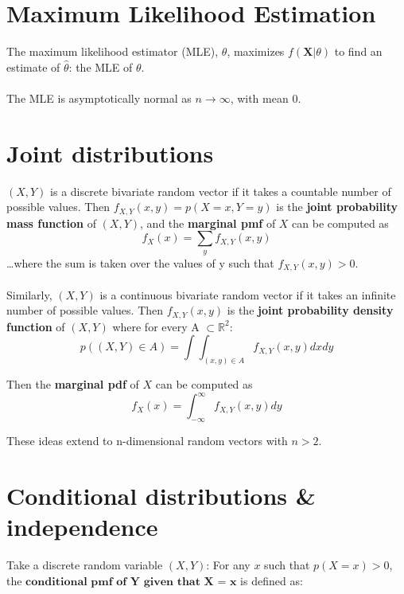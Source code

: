 \documentclass[12pt]{book}
\begin{document}
\section{Maximum Likelihood Estimation}
The maximum likelihood estimator (MLE), $\theta$, maximizes $f(\textbf{X}|\theta)$ to find an estimate of $\hat \theta$: the MLE of $\theta$. 
\\\\
The MLE is asymptotically normal as $n \rightarrow \infty$, with mean 0.
\\


\section{Joint distributions}
$(X,Y)$ is a discrete bivariate random vector if it takes a
countable number of possible values. Then $f_{X,Y}(x,y) = p(X = x, Y = y)$ is the \textbf{joint probability mass
function} of $(X,Y)$, and the \textbf{marginal pmf} of $X$ can be computed as
\begin{equation}
f_X(x) = \sum_{y}f_{X,Y}(x,y)
\end{equation}
\dots where the sum is taken over the values of y such that
$f_{X,Y}(x,y) > 0$.
\\\\
Similarly, $(X,Y)$ is a continuous bivariate random vector if it takes an
infinite number of possible values. Then $f_{X,Y}(x,y)$ is the \textbf{joint probability density
function} of $(X,Y)$ where for every A $\subset \mathbb{R}^2$:
\begin{equation}
	p((X,Y) \in A) = \int \int_{(x,y) \in A} f_{X,Y}(x,y) dx dy
\end{equation}

Then the \textbf{marginal pdf} of $X$ can be computed as
\begin{equation}
f_X(x) = \int_{-\infty}^{\infty} f_{X,Y}(x,y) dy
\end{equation}

These ideas extend to n-dimensional random vectors with $n>2$. 
\\



\section{Conditional distributions \& independence} 

Take a discrete random variable $(X,Y)$: For any $x$ such that $p(X = x) > 0$, the $\textbf{conditional pmf of Y given that X = x}$ is defined as: 
\end{document}

